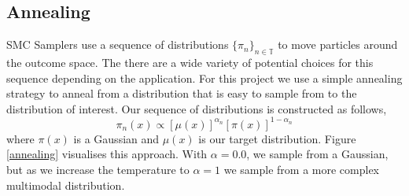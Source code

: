 \documentclass[12pt]{elsarticle}
\begin{document}
\subsection*{Annealing}
SMC Samplers use a sequence of distributions $\{\pi_n\}_{n\in \mathbb{T}}$ to move particles around the outcome space. The there are a wide variety of potential choices for this sequence depending on the application. For this project we use a simple annealing strategy to anneal from a distribution that is easy to sample from to the distribution of interest. Our sequence of distributions is constructed as follows,
\[
\pi_n(x) \propto [\mu(x)]^{\alpha_n}  [\pi(x)]^{1-\alpha_n}
\]
where $\pi(x)$ is a Gaussian and $\mu(x)$ is our target distribution. Figure \ref{annealing} visualises this approach. With $\alpha = 0.0$, we sample from a Gaussian, but as we increase the temperature to $\alpha = 1$ we sample from a more complex multimodal distribution.
\end{document}
